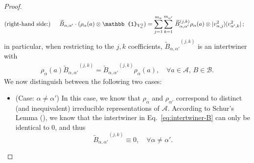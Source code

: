 \begin{proof}
\begin{align*}
\text{(right-hand side:) }  \quad \widetilde{B}_{\alpha,\alpha'} \cdot (\rho_{\alpha}(a) \otimes \mathbb{1}_{V_\alpha^2})&= \sum_{j=1}^{m_\alpha} \sum_{k=1}^{m_{\alpha'}} \,  {\widetilde{B}_{\alpha,\alpha'}}^{(j,k)} \rho_\alpha(a) \otimes \ket{v_{\alpha,j}^2} \hspace{-1mm}\bra{v_{\alpha',k}^2};
\end{align*}
in particular, when restricting to the $j,k$ coefficients, ${\widetilde{B}_{\alpha,\alpha'}}^{(j,k)}$ is an intertwiner with
\begin{align}\label{eq:intertwiner-B}
\rho_\alpha(a) {\widetilde{B}_{\alpha,\alpha'}}^{(j,k)}  = {\widetilde{B}_{\alpha,\alpha'}}^{(j,k)} \rho_\alpha(a), \quad \forall a \in \mathcal{A}, \, B \in \mathcal{B}.    
\end{align}
We now distinguish between the following two cases:
\begin{itemize}
    \item (Case: $\alpha \neq \alpha'$) In this case, we know that $\rho_{\alpha}$ and $\rho_{\alpha'}$ correspond to distinct (and inequivalent) irreducible representations of $\mathcal{A}$. According to Schur's Lemma (), we know that the intertwiner in Eq.~\eqref{eq:intertwiner-B} can only be identical to $0$, and thus
    $$
    {\widetilde{B}_{\alpha,\alpha'}}^{(j,k)} \equiv 0, \quad \forall \alpha \neq \alpha'.
    $$


\end{itemize}
\end{proof}
